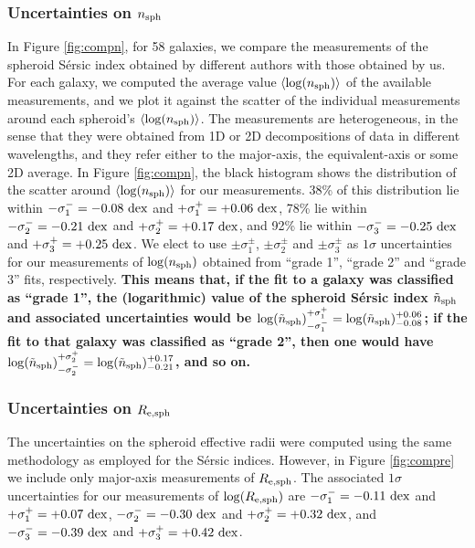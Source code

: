 \documentclass[preprint2]{emulateapj}
\begin{document}
\subsubsection{Uncertainties on $n_{\rm sph}$}
In Figure \ref{fig:compn}, for 58 galaxies, 
we compare the measurements of the spheroid S\'ersic index obtained by different authors 
with those obtained by us. 
For each galaxy, we computed the average value $\langle \log(n_{\rm sph}) \rangle$ of the available measurements, 
and we plot it against the scatter of the individual measurements around each spheroid's $\langle \log(n_{\rm sph}) \rangle$.
The measurements are heterogeneous, 
in the sense that they were obtained from 1D or 2D decompositions of data in different wavelengths, 
and they refer either to the major-axis, the equivalent-axis or some 2D average.
In Figure \ref{fig:compn}, the black histogram shows the distribution of the scatter around $\langle \log(n_{\rm sph}) \rangle$ 
for our measurements. 
38\% of this distribution lie within $-\sigma_1^- = -0.08~\rm dex$ and $+\sigma_1^+ = +0.06~\rm dex$, 
78\% lie within $-\sigma_2^- = -0.21~\rm dex$ and $+\sigma_2^+ = +0.17~\rm dex$,
and 92\% lie within $-\sigma_3^- = -0.25~\rm dex$ and $+\sigma_3^+ = +0.25~\rm dex$. 
We elect to use $\pm \sigma_1^\pm$, $\pm \sigma_2^\pm$ and $\pm \sigma_3^\pm$ as $1\sigma$ uncertainties 
for our measurements of $\log(n_{\rm sph})$ obtained from ``grade 1'', ``grade 2'' and ``grade 3'' fits, respectively. 
{\bf This means that, if the fit to a galaxy was classified as ``grade 1'', 
the (logarithmic) value of the spheroid S\'ersic index $\tilde{n}_{\rm sph}$ and associated uncertainties would be 
$\log(\tilde{n}_{\rm sph})^{+\sigma_1^+}_{-\sigma_1^-} = \log(\tilde{n}_{\rm sph})^{+0.06}_{-0.08}$; 
if the fit to that galaxy was classified as ``grade 2'', 
then one would have $\log(\tilde{n}_{\rm sph})^{+\sigma_2^+}_{-\sigma_2^-} = \log(\tilde{n}_{\rm sph})^{+0.17}_{-0.21}$, 
and so on.  } 

\subsubsection{Uncertainties on $R_{\rm e,sph}$}
The uncertainties on the spheroid effective radii were computed using the same methodology as employed for the S\'ersic indices. 
However, in Figure \ref{fig:compre} we include only major-axis measurements of $R_{\rm e,sph}$. 
The associated $1\sigma$ uncertainties for our measurements of $\log(R_{\rm e,sph})$ are 
$-\sigma_1^- = -0.11~\rm dex$ and $+\sigma_1^+ = +0.07~\rm dex$, 
$-\sigma_2^- = -0.30~\rm dex$ and $+\sigma_2^+ = +0.32~\rm dex$,
and $-\sigma_3^- = -0.39~\rm dex$ and $+\sigma_3^+ = +0.42~\rm dex$. 
\end{document}
